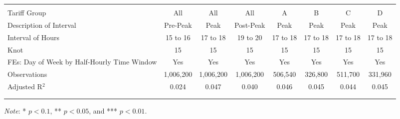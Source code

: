 \begin{table}[ht!]
\begin{adjustbox}{scale = 0.75}
\begin{threeparttable}
\begin{tabular}{@{\extracolsep{10pt}}lccccccc}
                    & & & & & & & \\
                    \hline
                    \\[-2.0ex]
                    Tariff Group & All & All & All & A & B & C & D \\
                    Description of Interval & Pre-Peak & Peak & Post-Peak & Peak & Peak & Peak & Peak \\
                    Interval of Hours & 15 to 16 & 17 to 18 & 19 to 20 & 17 to 18 & 17 to 18 & 17 to 18 & 17 to 18 \\
                    Knot & 15 & 15 & 15 & 15 & 15 & 15 & 15 \\
                    FEs: Day of Week by Half-Hourly Time Window & Yes & Yes & Yes & Yes & Yes & Yes & Yes \\
                    Observations & 1,006,200 & 1,006,200 & 1,006,200 & 506,540 & 326,800 & 511,700 & 331,960 \\
                    Adjusted R$^{2}$ & 0.024 & 0.047 & 0.040 & 0.046 & 0.045 & 0.044 & 0.045 \\
                    \\[-2.0ex]
                    \hline \hline
                    \\[-4.5ex]
                \end{tabular}
                \begin{tablenotes}[flushleft]
                    \footnotesize
                    \item \textit{Note}: * $p < 0.1$, ** $p < 0.05$, and *** $p < 0.01$.
                \end{tablenotes}
            \end{threeparttable}
        \end{adjustbox}
    \end{table}
